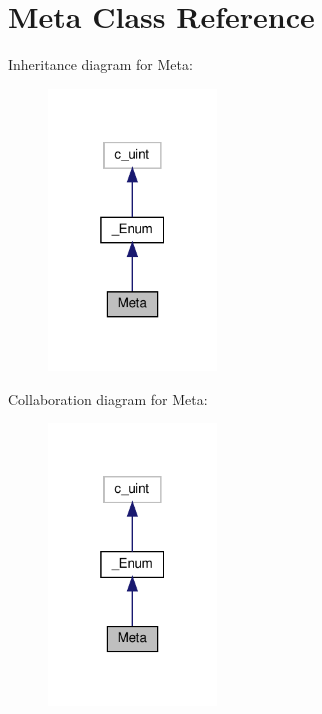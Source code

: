 \hypertarget{classvlc_1_1_meta}{}\section{Meta Class Reference}
\label{classvlc_1_1_meta}


Inheritance diagram for Meta\+:
\nopagebreak
\begin{figure}[H]
\begin{center}
\leavevmode
\includegraphics[width=127pt]{classvlc_1_1_meta__inherit__graph}
\end{center}
\end{figure}


Collaboration diagram for Meta\+:
\nopagebreak
\begin{figure}[H]
\begin{center}
\leavevmode
\includegraphics[width=127pt]{classvlc_1_1_meta__coll__graph}
\end{center}
\end{figure}
